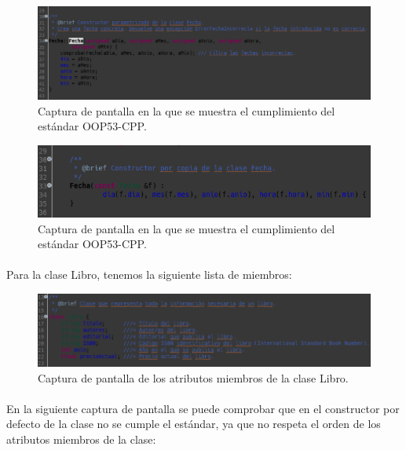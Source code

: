 			\begin{figure}[H]
				\centering
				\includegraphics[scale=0.5]{img/captura10.png}
				\caption{Captura de pantalla en la que se muestra el cumplimiento del estándar OOP53-CPP.}
				\label{captura10}
			\end{figure}
		
			\begin{figure}[H]
				\centering
				\includegraphics[scale=0.7]{img/captura11.png}
				\caption{Captura de pantalla en la que se muestra el cumplimiento del estándar OOP53-CPP.}
				\label{captura11}
			\end{figure}
		
			\paragraph{}Para la clase Libro, tenemos la siguiente lista de miembros:
			
			\begin{figure}[H]
				\centering
				\includegraphics[scale=0.55]{img/captura12.png}
				\caption{Captura de pantalla de los atributos miembros de la clase Libro.}
				\label{captura12}
			\end{figure}
		
			\paragraph{}En la siguiente captura de pantalla se puede comprobar que en el constructor por defecto de la clase no se cumple el estándar, ya que no respeta el orden de los atributos miembros de la clase:
			
